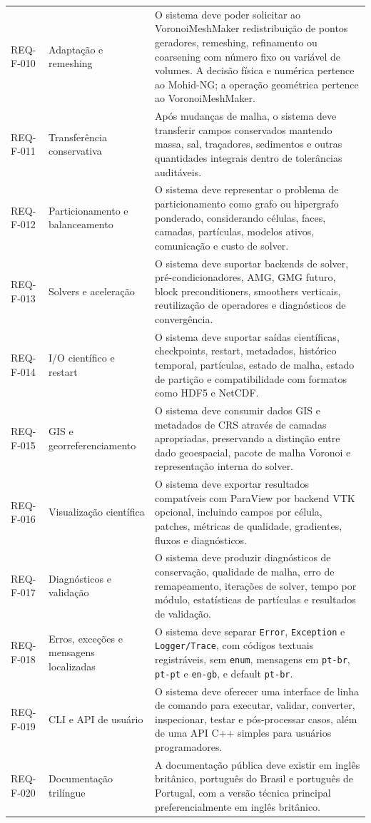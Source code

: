 \documentclass[11pt,a4paper]{article}
\begin{document}
\begin{longtable}{p{}p{}p{}}
\addlinespace
REQ-F-010 & Adapta\c{c}\~ao e remeshing & O sistema deve poder solicitar ao VoronoiMeshMaker redistribui\c{c}\~ao de pontos geradores, remeshing, refinamento ou coarsening com n\'umero fixo ou vari\'avel de volumes. A decis\~ao f\'isica e num\'erica pertence ao Mohid-NG; a opera\c{c}\~ao geom\'etrica pertence ao VoronoiMeshMaker.\tabularnewline
\addlinespace
REQ-F-011 & Transfer\^encia conservativa & Ap\'os mudan\c{c}as de malha, o sistema deve transferir campos conservados mantendo massa, sal, tra\c{c}adores, sedimentos e outras quantidades integrais dentro de toler\^ancias audit\'aveis.\tabularnewline
\addlinespace
REQ-F-012 & Particionamento e balanceamento & O sistema deve representar o problema de particionamento como grafo ou hipergrafo ponderado, considerando c\'elulas, faces, camadas, part\'iculas, modelos ativos, comunica\c{c}\~ao e custo de solver.\tabularnewline
\addlinespace
REQ-F-013 & Solvers e acelera\c{c}\~ao & O sistema deve suportar backends de solver, pr\'e-condicionadores, AMG, GMG futuro, block preconditioners, smoothers verticais, reutiliza\c{c}\~ao de operadores e diagn\'osticos de converg\^encia.\tabularnewline
\addlinespace
REQ-F-014 & I/O cient\'ifico e restart & O sistema deve suportar sa\'idas cient\'ificas, checkpoints, restart, metadados, hist\'orico temporal, part\'iculas, estado de malha, estado de parti\c{c}\~ao e compatibilidade com formatos como HDF5 e NetCDF.\tabularnewline
\addlinespace
REQ-F-015 & GIS e georreferenciamento & O sistema deve consumir dados GIS e metadados de CRS atrav\'es de camadas apropriadas, preservando a distin\c{c}\~ao entre dado geoespacial, pacote de malha Voronoi e representa\c{c}\~ao interna do solver.\tabularnewline
\addlinespace
REQ-F-016 & Visualiza\c{c}\~ao cient\'ifica & O sistema deve exportar resultados compat\'iveis com ParaView por backend VTK opcional, incluindo campos por c\'elula, patches, m\'etricas de qualidade, gradientes, fluxos e diagn\'osticos.\tabularnewline
\addlinespace
REQ-F-017 & Diagn\'osticos e valida\c{c}\~ao & O sistema deve produzir diagn\'osticos de conserva\c{c}\~ao, qualidade de malha, erro de remapeamento, itera\c{c}\~oes de solver, tempo por m\'odulo, estat\'isticas de part\'iculas e resultados de valida\c{c}\~ao.\tabularnewline
\addlinespace
REQ-F-018 & Erros, exce\c{c}\~oes e mensagens localizadas & O sistema deve separar \texttt{Error}, \texttt{Exception} e \texttt{Logger/Trace}, com c\'odigos textuais registr\'aveis, sem \texttt{enum}, mensagens em \texttt{pt-br}, \texttt{pt-pt} e \texttt{en-gb}, e default \texttt{pt-br}.\tabularnewline
\addlinespace
REQ-F-019 & CLI e API de usu\'ario & O sistema deve oferecer uma interface de linha de comando para executar, validar, converter, inspecionar, testar e p\'os-processar casos, al\'em de uma API C++ simples para usu\'arios programadores.\tabularnewline
\addlinespace
REQ-F-020 & Documenta\c{c}\~ao tril\'ingue & A documenta\c{c}\~ao p\'ublica deve existir em ingl\^es brit\^anico, portugu\^es do Brasil e portugu\^es de Portugal, com a vers\~ao t\'ecnica principal preferencialmente em ingl\^es brit\^anico.\tabularnewline
\bottomrule
\end{longtable}
\end{document}
